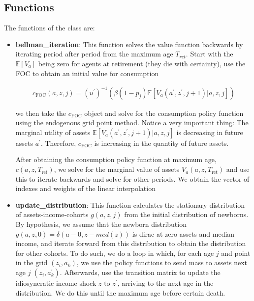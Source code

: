 \documentclass[12pt]{article} %
\theoremstyle{theorem}
\theoremstyle{definition}
\begin{document}
\subsection*{Functions}

The functions of the class are:

\begin{itemize}
\item \textbf{bellman\_iteration}: This function solves the value function backwards by iterating period after period from the maximum age $T_{ret}$. Start with the $\mathbb{E}[V_a]$ being zero for agents at retirement (they die with certainty), use the FOC to obtain an initial value for consumption

\begin{align} \label{eq:c_foc}
c_{\text{FOC}}(a,z,j) = (u^{\prime})^{-1} \left( \beta (1-p_{j}) \mathbb{E}[V_a(a^{\prime},z^{\prime},j+1)|a,z,j]\right)
\end{align} 

we then take the $c_{\text{FOC}}$ object and solve for the consumption policy function using the endogenous grid point method. Notice a very important thing: \color{red} The marginal utility of assets $\mathbb{E}[V_a(a^{\prime},z^{\prime},j+1)|a,z,j]$ is decreasing in future assets $a^{\prime}$. Therefore, $c_{\text{FOC}}$ is increasing in the quantity of future assets. \color{black} 

After obtaining the consumption policy function at maximum age, $c(a,z,T_{\text{ret}})$, we solve for the marginal value of assets $V_a (a,z,T_{\text{ret}})$ and use this to iterate backwards and solve for other periods. We obtain the vector of indexes and weights of the linear interpolation

\item \textbf{update\_distribution}: This function calculates the stationary-distribution of assets-income-cohorts $g(a,z,j)$ from the initial distribution of newborns. By hypothesis, we assume that the newborn distribution $g(a,z,0) = \delta (a-0,z-med(z))$ is dirac at zero assets and median income, and iterate forward from this distribution to obtain the distribution for other cohorts. To do such, we do a loop in which, for each age $j$ and point in the grid $(z_i,a_k)$, we use the policy functions to send mass to assets next age $j$ $(z_i,a^{\prime}_k)$. Afterwards, use the transition matrix to update the idiosyncratic income shock $z$ to $z^{\prime}$, arriving to the next age in the distribution. We do this until the maximum age before certain death.


\end{itemize}
\end{document}
